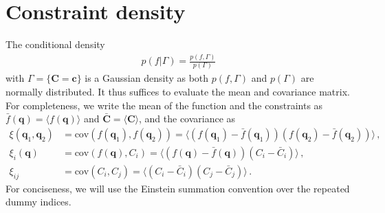 \documentclass[a4paper, 11pt]{article}
\begin{document}
\section{Constraint density}\label{ap:constraintDensity}
The conditional density 
\begin{align}
p(f|\Gamma) =\frac{p(f, \Gamma)}{p(\Gamma)}
\end{align}
with $\Gamma = \{\bm{C} = \bm{c}\}$ is a Gaussian density as both $p(f,\Gamma)$ and $p(\Gamma)$ are normally distributed. It thus suffices to evaluate the mean and covariance matrix. For completeness, we write the mean of the function and the constraints as $\bar{f}(\bm{q})=\langle f(\bm{q}) \rangle$ and $\bar{\bm{C}}=\langle \bm{C}\rangle$, and the covariance as
\begin{align}
\xi(\bm{q}_1,\bm{q}_2)& = \text{cov}(f(\bm{q}_1),f(\bm{q}_2))= \langle (f(\bm{q}_1) - \bar{f}(\bm{q}_1))(f(\bm{q}_2) - \bar{f}(\bm{q}_2))\rangle\,,\\
\xi_i(\bm{q}) &= \text{cov}(f(\bm{q}),C_i) = \langle (f(\bm{q})-\bar{f}(\bm{q}))(C_i - \bar{C}_i)\rangle\,,\\
\xi_{ij} &= \text{cov}(C_i,C_j) = \langle (C_i - \bar{C}_i)(C_j-\bar{C}_j)\rangle\,.
\end{align}
For conciseness, we will use the Einstein summation convention over the repeated dummy indices.
\end{document}
